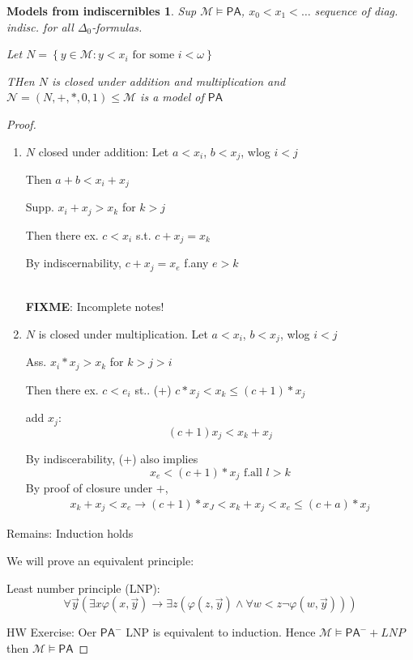 \documentclass[12pt]{article}
\newcommand{\PA}{\ensuremath{\mathsf{PA}}}
\newcommand{\fixme}{\\ \textbf{FIXME}: Incomplete notes!}
\begin{document}
\newtheorem*{modelsi}{Models from indiscernibles}
\begin{modelsi}
  Sup $\mathcal{M} \models \PA$, $x_0 < x_1 < \dots$ sequence of diag. indisc.
  for all $\Delta_0$-formulas.

  Let $N = \left\{ y \in \mathcal{M} : y < x_i \text{ for some } i < \omega \right\}$

  THen $N$ is closed under addition and multiplication
  and $\mathcal{N} = (N, +, *, 0, 1) \le \mathcal{M}$ is a model of $\PA$
\end{modelsi}
\begin{proof}
\begin{enumerate}[(1)]
  \item $N$ closed under addition:
    Let $a < x_i$, $b < x_j$, wlog $i < j$

    Then $a + b < x_i + x_j$

    Supp. $x_i + x_j > x_k$ for $k > j$

    Then there ex. $c < x_i$ s.t. $c + x_j = x_k$

    By indiscernability, $c+x_j = x_e$ f.any $e > k$

    \fixme %

  \item $N$ is closed under multiplication.
    Let $a < x_i$, $b < x_j$, wlog $i < j$

    Ass. $x_i * x_j > x_k$ for $k > j > i$

    Then there ex. $c < e_i$ st..
    (+) $c * x_j < x_k \le (c+1) * x_j$

    add $x_j$:
    \[
(c+1) x_j < x_k + x_j
    \]

    By indiscerability, (+) also implies
    \[
    x_e < (c+1)* x_j \text{  f.all } l > k
    \]
    By proof of closure under $+$,
    \begin{align*}
x_k + x_j < x_e
\rightarrow (c +1) * x_J < x_k + x_j < x_e \le (c+a) * x_j
    \end{align*}
\end{enumerate}
Remains: Induction holds

We will prove an equivalent principle:

Least number principle (LNP):
\[
\forall \vec{y} \left( \exists x \varphi(x, \vec{y}) \rightarrow
\exists z (\varphi(z, \vec{y}) \wedge \forall w < z \neg \varphi(w, \vec{y}))\right)
\]

HW Exercise:
Oer $\PA^-$ LNP is equivalent to induction.
Hence $\mathcal{M} \models \PA^- + LNP$ then $\mathcal{M} \models \PA$
\end{proof}
\end{document}
